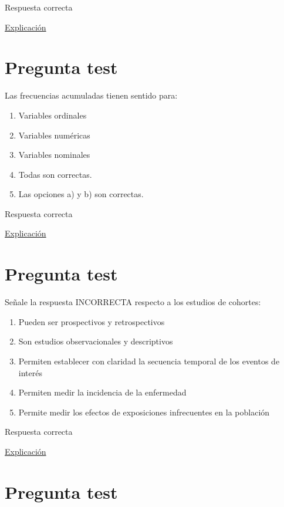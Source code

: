 \documentclass[
]{book}
\providecommand{\tightlist}{%
  \setlength{\itemsep}{0pt}\setlength{\parskip}{0pt}}
\begin{document}
Respuesta correcta

\href{https://es.wikipedia.org/wiki/Prevención_secundaria}{Explicación}

\hypertarget{pregunta-test-28}{%
\section{Pregunta test}\label{pregunta-test-28}}

Las frecuencias acumuladas tienen sentido para:

\begin{enumerate}
\def\labelenumi{\alph{enumi})}
\tightlist
\item
  Variables ordinales
\item
  Variables numéricas
\item
  Variables nominales
\item
  Todas son correctas.
\item
  Las opciones a) y b) son correctas.
\end{enumerate}

Respuesta correcta

\href{https://1fjmanzano.github.io/bioestadistica/tablas-de-frecuencias.html}{Explicación}

\hypertarget{pregunta-test-29}{%
\section{Pregunta test}\label{pregunta-test-29}}

Señale la respuesta INCORRECTA respecto a los estudios de cohortes:

\begin{enumerate}
\def\labelenumi{\alph{enumi})}
\tightlist
\item
  Pueden ser prospectivos y retrospectivos
\item
  Son estudios observacionales y descriptivos
\item
  Permiten establecer con claridad la secuencia temporal de los eventos de interés
\item
  Permiten medir la incidencia de la enfermedad
\item
  Permite medir los efectos de exposiciones infrecuentes en la población
\end{enumerate}

Respuesta correcta

\href{https://es.wikipedia.org/wiki/Estudio_de_cohorte}{Explicación}

\hypertarget{pregunta-test-30}{%
\section{Pregunta test}\label{pregunta-test-30}}
\end{document}
